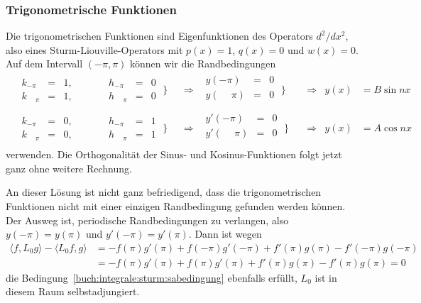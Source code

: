 \subsubsection{Trigonometrische Funktionen}
Die trigonometrischen Funktionen sind Eigenfunktionen des Operators
$d^2/dx^2$, also eines Sturm-Liouville-Operators mit $p(x)=1$, $q(x)=0$
und $w(x)=0$.
Auf dem Intervall $(-\pi,\pi)$ können wir die Randbedingungen
\bgroup
\renewcommand{\arraycolsep}{2pt}
\[
\begin{aligned}
&
\begin{array}{lclclcl}
k_{-\pi}          &=&1,&\qquad&h_{-\pi}          &=&0\\
k_{\phantom{-}\pi}&=&1,&\qquad&h_{\phantom{-}\pi}&=&0
\end{array}
\;\bigg\}
&&\Rightarrow&
\begin{array}{lcl}
y(-\pi)          &=&0\\
y(\phantom{-}\pi)&=&0\\
\end{array}
\;\bigg\}
&\quad\Rightarrow&
y(x) &= B\sin nx
\\
&
\begin{array}{lclclcl}
k_{-\pi}          &=&0,&\qquad&h_{-\pi}          &=&1\\
k_{\phantom{-}\pi}&=&0,&\qquad&h_{\phantom{-}\pi}&=&1
\end{array}
\;\bigg\}
&&\Rightarrow&
\begin{array}{lcl}
y'(-\pi)          &=&0\\
y'(\phantom{-}\pi)&=&0\\
\end{array}
\; \bigg\}
&\quad\Rightarrow&
y(x) &= A\cos nx
\end{aligned}
\]
\egroup
verwenden.
Die Orthogonalität der Sinus- und Kosinus-Funktionen folgt jetzt
ganz ohne weitere Rechnung.

An dieser Lösung ist nicht ganz befriedigend, dass die trigonometrischen
Funktionen nicht mit einer einzigen Randbedingung gefunden werden können.
Der Ausweg ist, periodische Randbedingungen zu verlangen, also
$y(-\pi)=y(\pi)$ und $y'(-\pi)=y'(\pi)$.
Dann ist wegen
\begin{align*}
\langle f,L_0g\rangle - \langle L_0f,g\rangle
&=
-f(\pi)g'(\pi)+f(-\pi)g'(-\pi)+f'(\pi)g(\pi)-f'(-\pi)g(-\pi)
\\
&=
-f(\pi)g'(\pi)+f(\pi)g'(\pi)+f'(\pi)g(\pi)-f'(\pi)g(\pi)
=0
\end{align*}
die Bedingung~\eqref{buch:integrale:sturm:sabedingung}
ebenfalls erfüllt, $L_0$ ist in diesem Raum selbstadjungiert.

